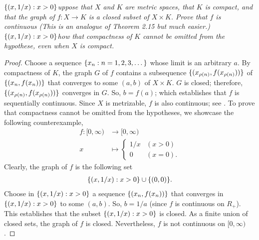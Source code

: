 \textit{%
$\{(x,1/x): x > 0\}$uppose that $X$ and $K$ are metric spaces, %
that $K$ is compact, and that the graph of %
%
  $f:X\to K$ %
%
is a closed subset of $X\times K$. %
Prove that $f$ is continuous %
%
  (This is an analogue of Theorem 2.15 but much easier.) %
%
$\{(x,1/x): x > 0\}$how that compactness of $K$ cannot be omitted from the hypothese, %
even when $X$ is compact.
}
%
\begin{proof}%
Choose a sequence $\{x_n: n=1, 2, 3, \dots\}$ whose limit is an arbitrary $a$. %
By compactness of $K$, the graph $G$ of $f$ contains a subsequence %
%
  $\{
    (x_{\rho(n)}, f(x_{\rho(n)}))
  \}$
%
of %
%
  $\{
    (x_n, f(x_n))
  \}$
%
that converges to some $(a, b)$ of $X\times K$. %
$G$ is closed; therefore, $\{(x_{\rho(n)}, f(x_{\rho(n)}))\}$
converges in $G$. So, $b=f(a)$; %
which establishes that $f$ is sequentially continuous.
%
Since $X$ is metrizable, $f$ is also continuous; see \citeresultFA{[A6]}. %
%
\newline\newline\noindent %
%
To prove that compactness cannot be omitted from the hypotheses, %
we showcase the following counterexample, %
%
  \begin{align}
  f: [0, \infty) & \to [0, \infty)\\
     x & \mapsto\begin{cases}
       1/x & (x > 0)  \\
       0   & (x = 0).
    \end{cases}
  \end{align}
%
Clearly, the graph of $f$ is the following set
%
  \begin{align}
    \{(x, 1/x): x > 0\} \cup \{(0, 0)\}.
  \end{align}
%
Choose in $\{(x,1/x): x > 0\}$ a sequence $\{(x_n, f(x_n))\}$ %
that converges in $\{(x,1/x): x > 0\}$ to some $(a, b)$. %
So, $b = 1/a$ (since $f$ is continuous on $R_+$).
This establishes that the subset $\{(x,1/x): x > 0\}$ is closed. %
As a finite union of closed sets, the graph of $f$ is closed. 
%
Nevertheless, $f$ is not continuous on $[0, \infty)$.
\end{proof}
%
